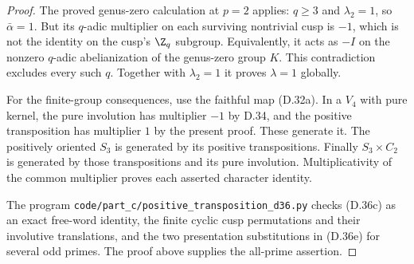 \begin{proof}
The proved genus-zero calculation at $p=2$ applies:
$q\geq3$ and $\lambda_2=1$, so $\bar\alpha=1$.
But its $q$-adic multiplier on each surviving
nontrivial cusp is $-1$, which is not the
identity on the cusp's $\Z_q$ subgroup.  Equivalently,
it acts as $-I$ on the nonzero $q$-adic abelianization
of the genus-zero group $K$.  This contradiction
excludes every such $q$.  Together with
$\lambda_2=1$ it proves $\lambda=1$ globally.

For the finite-group consequences, use the faithful
map (D.32a).  In a $V_4$ with pure kernel, the
pure involution has multiplier $-1$ by D.34,
and the positive transposition has multiplier
$1$ by the present proof.  These generate it.
The positively oriented $S_3$ is generated by
its positive transpositions.  Finally
$S_3\times C_2$ is generated by those
transpositions and its pure involution.
Multiplicativity of the common multiplier proves
each asserted character identity.

The program \texttt{code/part\_c/positive\_transposition\_d36.py}
checks (D.36c) as an exact free-word identity,
the finite cyclic cusp permutations and their
involutive translations, and the two presentation
substitutions in (D.36e) for several odd primes.
The proof above supplies the all-prime assertion.
\end{proof}

